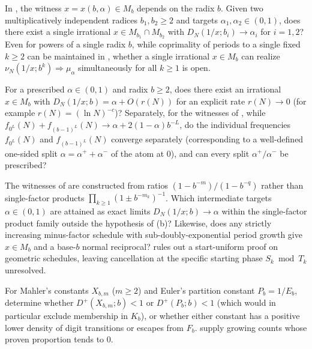 \documentclass[11pt]{article}
\begin{document}
\begin{question}\label{q:multiradix}
In , the witness $x=x(b,\alpha)\in M_b$ depends on the radix $b$. Given two multiplicatively independent radices $b_1,b_2\ge2$ and targets $\alpha_1,\alpha_2\in(0,1)$, does there exist a single irrational $x\in M_{b_1}\cap M_{b_2}$ with $D_N(1/x;b_i)\to\alpha_i$ for $i=1,2$? Even for powers of a single radix $b$, while coprimality of periods to a single fixed $k\ge2$ can be maintained in , whether a single irrational $x\in M_b$ can realize $\nu_N(1/x;b^k)\Rightarrow\mu_\alpha$ simultaneously for all $k\ge1$ is open.
\end{question}

\begin{question}\label{q:effective}
For a prescribed $\alpha\in(0,1)$ and radix $b\ge2$, does there exist an irrational $x\in M_b$ with $D_N(1/x;b)=\alpha+O(r(N))$ for an explicit rate $r(N)\to0$ (for example $r(N)=(\ln N)^{-c}$)? Separately, for the witnesses of , while $f_{0^L}(N)+f_{(b-1)^L}(N)\to\alpha+2(1-\alpha)b^{-L}$, do the individual frequencies $f_{0^L}(N)$ and $f_{(b-1)^L}(N)$ converge separately (corresponding to a well-defined one-sided split $\alpha=\alpha^++\alpha^-$ of the atom at $0$), and can every split $\alpha^+/\alpha^-$ be prescribed?
\end{question}

\begin{question}\label{q:single-factor}
The witnesses of  are constructed from ratios $(1-b^{-m})/(1-b^{-q})$ rather than single-factor products $\prod_{k\ge1}(1\pm b^{-m_k})^{-1}$. Which intermediate targets $\alpha\in(0,1)$ are attained as exact limits $D_N(1/x;b)\to\alpha$ within the single-factor product family outside the hypothesis of (b)? Likewise, does any strictly increasing minus-factor schedule with sub-doubly-exponential period growth give $x\in M_b$ and a base-$b$ normal reciprocal?  rules out a start-uniform proof on geometric schedules, leaving cancellation at the specific starting phase $S_k\bmod T_k$ unresolved.
\end{question}

\begin{question}\label{q:classical-part}
For Mahler's constants $X_{b,m}$ ($m\ge2$) and Euler's partition constant $P_b=1/E_b$, determine whether $D^+(X_{b,m};b)<1$ or $D^+(P_b;b)<1$ (which would in particular exclude membership in $K_b$), or whether either constant has a positive lower density of digit transitions or escapes from $F_b$.  supply growing counts whose proven proportion tends to $0$.
\end{question}
\end{document}
